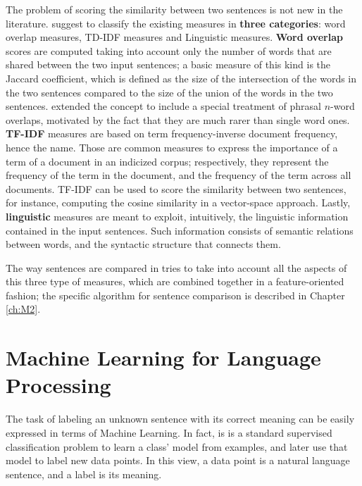 The problem of scoring the similarity between two sentences is not new in the literature. \cite{Achananuparp:2008:ESS:1430555.1430594} suggest to classify the existing measures in \textbf{three categories}: word overlap measures, TD-IDF measures and Linguistic measures. \textbf{Word overlap} scores are computed taking into account only the number of words that are shared between the two input sentences; a basic measure of this kind is the Jaccard coefficient, which is defined as the size of the intersection of the words in the two sentences compared to the size of the union of the words in the two sentences. \cite{Banerjee03extendedgloss} extended the concept to include a special treatment of phrasal $n$-word overlaps, motivated by the fact that they are much rarer than single word ones. \textbf{TF-IDF} measures are based on term frequency-inverse document frequency, hence the name. Those are common measures to express the importance of a term of a document in an  indicized corpus; respectively, they represent the frequency of the term in the document, and the frequency of the term across all documents. TF-IDF can be used to score the similarity between two sentences, for instance, computing the cosine similarity in a vector-space approach. Lastly, \textbf{linguistic} measures are meant to exploit, intuitively, the linguistic information contained in the input sentences. Such information consists of semantic relations between words, and the syntactic structure that connects them. %

The way sentences are compared in \pname tries to take into account all the aspects of this three type of measures, which are combined together in a feature-oriented fashion; the specific algorithm for sentence comparison is described in Chapter \ref{ch:M2}.


\section{Machine Learning for Language Processing}
The task of labeling an unknown sentence with its correct meaning can be easily expressed in terms of Machine Learning. In fact, is is a standard supervised classification problem to learn a class' model from examples, and later use that model to label new data points. In this view, a data point is a natural language sentence, and a label is its meaning. 


